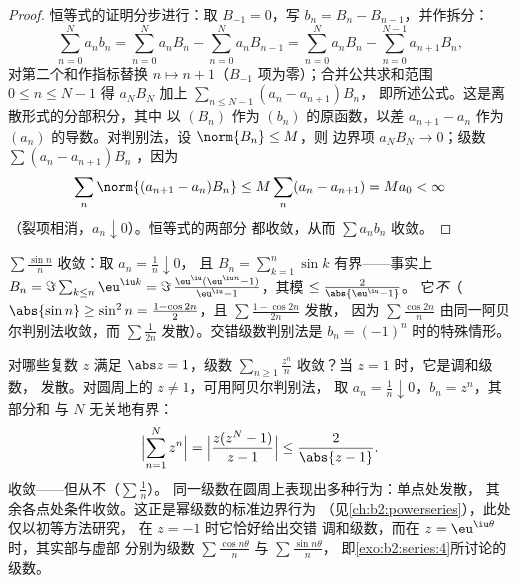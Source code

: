 \begin{proof}
恒等式的证明分步进行：取 $B_{-1} = 0$，写 $b_n = B_n -
B_{n-1}$，并作拆分：
\[
\sum_{n=0}^{N} a_nb_n
= \sum_{n=0}^{N} a_nB_n - \sum_{n=0}^{N} a_nB_{n-1}
= \sum_{n=0}^{N} a_nB_n - \sum_{n=0}^{N-1} a_{n+1}B_{n} ,
\]
对第二个和作指标替换 $n \mapsto n + 1$（$B_{-1}$
项为零）；合并公共求和范围 $0 \leq n \leq N-1$
得 $a_NB_N$ 加上 $\sum_{n\leq N-1}(a_n - a_{n+1})B_n$，
即所述公式。这是离散形式的分部积分，其中
以 $(B_n)$ 作为 $(b_n)$ 的原函数，以差 $a_{n+1}
- a_n$ 作为 $(a_n)$ 的导数。对判别法，设 $\norm{B_n}
\leq M$，则
边界项 $a_N B_N \to 0$；级数 $\sum (a_n -
a_{n+1})B_n$ ，因为
\[
\sum_n \norm{(a_{n+1} - a_n)B_n} \leq M \sum_n (a_n - a_{n+1})
= M a_0 < \infty
\]
（裂项相消，$a_n \downarrow 0$）。恒等式的两部分
都收敛，从而 $\sum a_n b_n$ 收敛。
\end{proof}

\begin{example}\label{ex:b2:series:sinn}
$\sum \frac{\sin n}{n}$ 收敛：取 $a_n = \frac1n \downarrow 0$，
且 $B_n = \sum_{k=1}^{n} \sin k$ 有界——事实上 $B_n =
\Im\sum_{k \leq n} \eu^{\iu k} = \Im\,\frac{\eu^{\iu}(\eu^{\iu n} -
1)}{\eu^{\iu} - 1}$，其模 $\leq \frac{2}{\abs{\eu^{\iu} - 1}}$。
它\emph{不}（$\abs{\sin n} \geq \sin^2 n
= \frac{1 - \cos 2n}{2}$，且 $\sum \frac{1 - \cos 2n}{2n}$ 发散，
因为 $\sum \frac{\cos 2n}{n}$ 由同一阿贝尔判别法收敛，而
$\sum \frac{1}{2n}$ 发散）。交错级数判别法是
$b_n = (-1)^n$ 时的特殊情形。
\end{example}

\begin{example}[收敛圆周上的阿贝尔判别法]\label{ex:b2:series:abelboundary}
对哪些复数 $z$ 满足 $\abs z = 1$，级数 $\sum_{n \geq 1}
\frac{z^n}{n}$ 收敛？当 $z = 1$ 时，它是调和级数，
发散。对圆周上的 $z \neq 1$，可用阿贝尔判别法，
取 $a_n = \frac1n \downarrow 0$，$b_n = z^n$，其部分和
与 $N$ 无关地有界：
\[
\Bigl|\sum_{n=1}^{N} z^n\Bigr|
= \Bigl|\frac{z(z^N - 1)}{z - 1}\Bigr|
\leq \frac{2}{\abs{z - 1}} .
\]
收敛——但从不（$\sum\frac1n$）。
同一级数在圆周上表现出多种行为：单点处发散，
其余各点处条件收敛。这正是幂级数的标准边界行为
（见\cref{ch:b2:powerseries}），此处仅以初等方法研究，
在 $z = -1$ 时它恰好给出交错
调和级数，而在 $z = \eu^{\iu\theta}$ 时，其实部与虚部
分别为级数 $\sum\frac{\cos
n\theta}{n}$ 与 $\sum\frac{\sin n\theta}{n}$，
即\cref{exo:b2:series:4}所讨论的级数。
\end{example}

